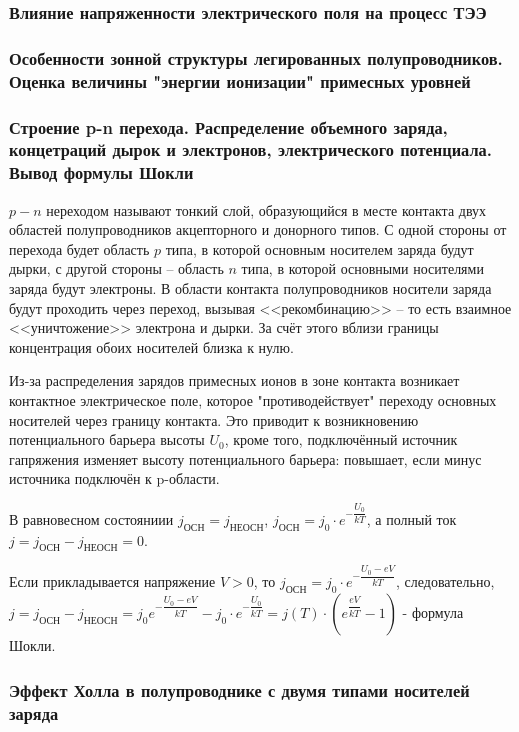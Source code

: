 \subsubsection{Влияние напряженности электрического поля на процесс ТЭЭ}

\subsubsection{Особенности зонной структуры легированных полупроводников. Оценка величины "энергии ионизации" примесных уровней}

\subsubsection{Строение p-n перехода. Распределение объемного заряда, концетраций дырок и электронов, электрического потенциала. Вывод формулы Шокли}

$p-n$ нереходом называют тонкий слой, образующийся в месте контакта двух областей полупроводников
акцепторного и донорного типов. С одной стороны от перехода будет область $p$ типа, в которой
основным носителем заряда будут дырки, с другой стороны -- область $n$ типа, в которой основными
носителями заряда будут электроны. В области контакта полупроводников носители заряда будут
проходить через переход, вызывая <<рекомбинацию>> -- то есть взаимное <<уничтожение>> электрона и дырки.
За счёт этого вблизи границы концентрация обоих носителей близка к нулю.

Из-за распределения зарядов примесных ионов в зоне контакта возникает контактное электрическое поле,
которое "противодействует" переходу основных носителей через границу контакта. Это приводит к возникновению потенциального барьера высоты $U_0$, кроме того, подключённый источник гапряжения изменяет высоту потенциального барьера: повышает, если минус источника подключён к p-области.

В равновесном состояниии $j_\text{ОСН} = j_\text{НЕОСН}$, $j_\text{ОСН} = j_0 \cdot e^{-\dfrac{U_0}{kT}}$, а полный ток $j = j_\text{ОСН} - j_\text{НЕОСН} = 0$.

Если прикладывается напряжение $V>0$, то $j_\text{ОСН} = j_0 \cdot e^{-\dfrac{U_0-eV}{kT}}$, следовательно, $j = j_\text{ОСН} - j_\text{НЕОСН} = j_0 e^{-\dfrac{U_0-eV}{kT}} - j_0 \cdot e^{-\dfrac{U_0}{kT}} = j(T) \cdot \left( e^{\dfrac{eV}{kT}} - 1 \right) $ - формула Шокли.

\subsubsection{Эффект Холла в полупроводнике с двумя типами носителей заряда}

